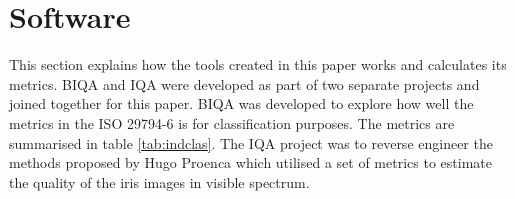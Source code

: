 
\section{Software}\label{sec:software}
\vspace{-4mm}
This section explains how the tools created in this paper works and calculates
its metrics.
BIQA and IQA were developed as part of two separate projects and joined
together for this paper.  BIQA\cite{biqa} was developed to explore how well 
the metrics in the ISO 29794-6 \cite{iso} is for classification
purposes. The metrics are summarised in table \ref{tab:indclas}.
The IQA\cite{iqa} project was to reverse engineer the methods proposed by Hugo
Proenca\cite{hugo} which utilised a set of metrics to estimate the quality of 
the iris images in visible spectrum.




%

